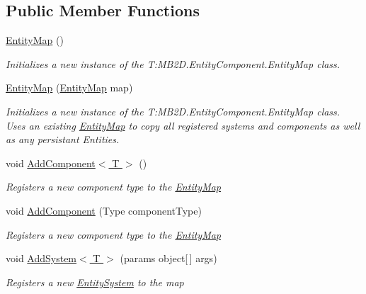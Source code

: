 \subsection*{Public Member Functions}
\begin{DoxyCompactItemize}
\item 
\hyperlink{class_m_b2_d_1_1_entity_component_1_1_entity_map_a3904c9181b806e476be24848837e1b53}{Entity\+Map} ()
\begin{DoxyCompactList}\small\item\em Initializes a new instance of the T\+:\+M\+B2\+D.\+Entity\+Component.\+Entity\+Map class. \end{DoxyCompactList}\item 
\hyperlink{class_m_b2_d_1_1_entity_component_1_1_entity_map_ac8f0662e42b90d8299e1044a1c429863}{Entity\+Map} (\hyperlink{class_m_b2_d_1_1_entity_component_1_1_entity_map}{Entity\+Map} map)
\begin{DoxyCompactList}\small\item\em Initializes a new instance of the T\+:\+M\+B2\+D.\+Entity\+Component.\+Entity\+Map class. Uses an existing \hyperlink{class_m_b2_d_1_1_entity_component_1_1_entity_map}{Entity\+Map} to copy all registered systems and components as well as any persistant Entities. \end{DoxyCompactList}\item 
void \hyperlink{class_m_b2_d_1_1_entity_component_1_1_entity_map_a3832e5a6ae181f71d002e81caf008da4}{Add\+Component$<$ T $>$} ()
\begin{DoxyCompactList}\small\item\em Registers a new component type to the \hyperlink{class_m_b2_d_1_1_entity_component_1_1_entity_map}{Entity\+Map} \end{DoxyCompactList}\item 
void \hyperlink{class_m_b2_d_1_1_entity_component_1_1_entity_map_aff9e50266b46d782c31c5b482b86540c}{Add\+Component} (Type component\+Type)
\begin{DoxyCompactList}\small\item\em Registers a new component type to the \hyperlink{class_m_b2_d_1_1_entity_component_1_1_entity_map}{Entity\+Map} \end{DoxyCompactList}\item 
void \hyperlink{class_m_b2_d_1_1_entity_component_1_1_entity_map_af2aefc425308f1ca680b0083f3acab0d}{Add\+System$<$ T $>$} (params object\mbox{[}$\,$\mbox{]} args)
\begin{DoxyCompactList}\small\item\em Registers a new \hyperlink{class_m_b2_d_1_1_entity_component_1_1_entity_system}{Entity\+System} to the map \end{DoxyCompactList}\item 

\end{DoxyCompactItemize}
